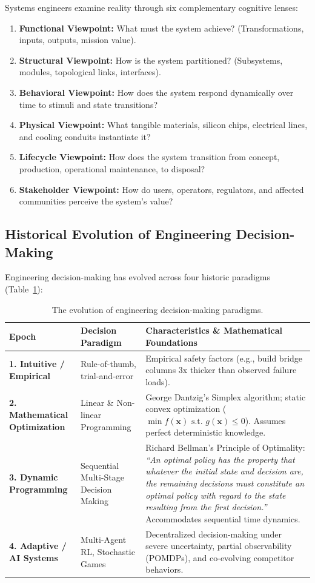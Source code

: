 Systems engineers examine reality through six complementary cognitive lenses:
\begin{enumerate}[leftmargin=2em]
    \item \textbf{Functional Viewpoint:} What must the system achieve? (Transformations, inputs, outputs, mission value).
    \item \textbf{Structural Viewpoint:} How is the system partitioned? (Subsystems, modules, topological links, interfaces).
    \item \textbf{Behavioral Viewpoint:} How does the system respond dynamically over time to stimuli and state transitions?
    \item \textbf{Physical Viewpoint:} What tangible materials, silicon chips, electrical lines, and cooling conduits instantiate it?
    \item \textbf{Lifecycle Viewpoint:} How does the system transition from concept, production, operational maintenance, to disposal?
    \item \textbf{Stakeholder Viewpoint:} How do users, operators, regulators, and affected communities perceive the system's value?
\end{enumerate}

\subsection{Historical Evolution of Engineering Decision-Making}
Engineering decision-making has evolved across four historic paradigms (Table~\ref{tab:decision_evolution}):

\begin{table}[htbp]
\centering
\small
\renewcommand{\arraystretch}{1.3}
\begin{tabularx}{\textwidth}{lp{3.5cm}X}
\toprule
\textbf{Epoch} & \textbf{Decision Paradigm} & \textbf{Characteristics \& Mathematical Foundations} \\
\midrule
\textbf{1. Intuitive / Empirical} & Rule-of-thumb, trial-and-error & Empirical safety factors (e.g., build bridge columns 3x thicker than observed failure loads). \\
\textbf{2. Mathematical Optimization} & Linear \& Non-linear Programming & George Dantzig's Simplex algorithm; static convex optimization ($\min f(\mathbf{x}) \text{ s.t. } g(\mathbf{x}) \le 0$). Assumes perfect deterministic knowledge. \\
\textbf{3. Dynamic Programming} & Sequential Multi-Stage Decision Making & Richard Bellman's Principle of Optimality: \textit{``An optimal policy has the property that whatever the initial state and decision are, the remaining decisions must constitute an optimal policy with regard to the state resulting from the first decision.''} Accommodates sequential time dynamics. \\
\textbf{4. Adaptive / AI Systems} & Multi-Agent RL, Stochastic Games & Decentralized decision-making under severe uncertainty, partial observability (POMDPs), and co-evolving competitor behaviors. \\
\bottomrule
\end{tabularx}
\caption{The evolution of engineering decision-making paradigms.}
\label{tab:decision_evolution}
\end{table}

